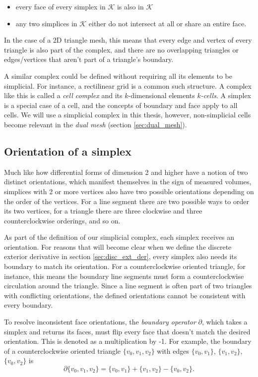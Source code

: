 \documentclass[utf8,english]{gradu3}
\begin{document}
\begin{itemize}
  \item every face of every simplex in $\mathcal{K}$ is also in $\mathcal{K}$
  \item any two simplices in $\mathcal{K}$ either do not intersect at all
    or share an entire face.
\end{itemize}

In the case of a 2D triangle mesh, this means
that every edge and vertex of every triangle is also part of the complex,
and there are no overlapping triangles
or edges/vertices that aren't part of a triangle's boundary.

A similar complex could be defined without requiring
all its elements to be simplicial.
For instance, a rectilinear grid is a common such structure.
A complex like this is called a \textit{cell complex}
and its $k$-dimensional elements \textit{$k$-cells}.
A simplex is a special case of a cell,
and the concepts of boundary and face apply to all cells.
We will use a simplicial complex in this thesis,
however, non-simplicial cells become relevant in the \textit{dual mesh}
(section \ref{sec:dual_mesh}).


\subsection{Orientation of a simplex}

Much like how differential forms of dimension 2 and higher
have a notion of two distinct orientations,
which manifest themselves in the sign of measured volumes,
simplices with 2 or more vertices also have two possible orientations
depending on the order of the vertices.
For a line segment there are two possible ways to order its two vertices,
for a triangle there are three clockwise and three counterclockwise orderings,
and so on.

As part of the definition of our simplicial complex,
each simplex receives an orientation.
For reasons that will become clear when
we define the discrete exterior derivative in section \ref{sec:disc_ext_der},
every simplex also needs its boundary to match its orientation.
For a counterclockwise oriented triangle, for instance,
this means the boundary line segments must form
a counterclockwise circulation around the triangle.
Since a line segment is often part of two triangles with conflicting orientations,
the defined orientations cannot be consistent with every boundary.

To resolve inconsistent face orientations,
the \textit{boundary operator} $\partial$,
which takes a simplex and returns its faces,
must flip every face that doesn't match the desired orientation.
This is denoted as a multiplication by -1.
For example, the boundary of a counterclockwise oriented triangle $\{v_0, v_1, v_2\}$
with edges $\{v_0, v_1\}$, $\{v_1, v_2\}$, $\{v_0, v_2\}$ is
\[
  \partial \{v_0, v_1, v_2\} = \{v_0, v_1\} + \{v_1, v_2\} - \{v_0, v_2\}.
\]
\end{document}
